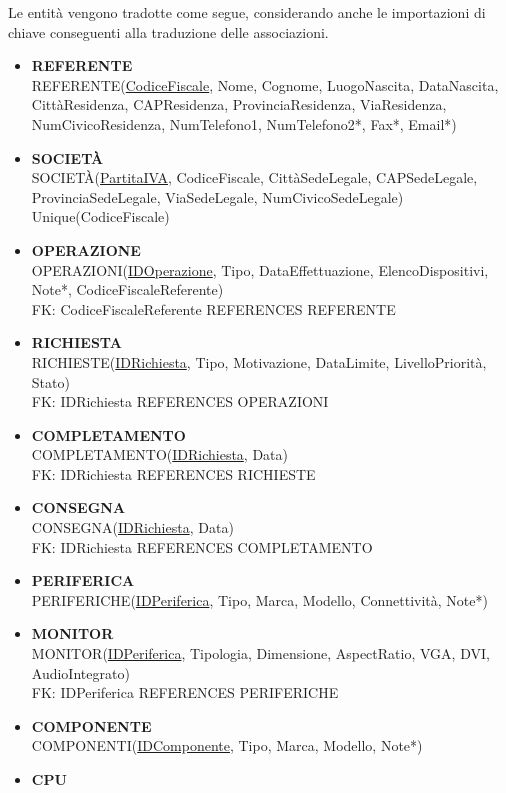 \documentclass[a4paper,12pt]{report}
\begin{document}
Le entità vengono tradotte come segue, considerando anche le importazioni di chiave conseguenti alla traduzione delle associazioni.
\begin{itemize}
	\item \textbf{REFERENTE}
		\\ REFERENTE(\underline{CodiceFiscale}, Nome, Cognome, LuogoNascita, DataNascita, CittàResidenza, CAPResidenza, ProvinciaResidenza, ViaResidenza, NumCivicoResidenza, NumTelefono1, NumTelefono2*, Fax*, Email*)
	\item \textbf{SOCIETÀ}
		\\ SOCIETÀ(\underline{PartitaIVA}, CodiceFiscale, CittàSedeLegale, CAPSedeLegale, ProvinciaSedeLegale, ViaSedeLegale, NumCivicoSedeLegale)
		\\ Unique(CodiceFiscale)
	\item \textbf{OPERAZIONE}
		\\ OPERAZIONI(\underline{IDOperazione}, Tipo, DataEffettuazione, ElencoDispositivi, Note*, CodiceFiscaleReferente)
		\\ FK: CodiceFiscaleReferente REFERENCES REFERENTE
	\item \textbf{RICHIESTA}
		\\ RICHIESTE(\underline{IDRichiesta}, Tipo, Motivazione, DataLimite, LivelloPriorità, Stato)
		\\ FK: IDRichiesta REFERENCES OPERAZIONI
	\item \textbf{COMPLETAMENTO}
		\\ COMPLETAMENTO(\underline{IDRichiesta}, Data)
		\\ FK: IDRichiesta REFERENCES RICHIESTE
	\item \textbf{CONSEGNA}
		\\ CONSEGNA(\underline{IDRichiesta}, Data)
		\\ FK: IDRichiesta REFERENCES COMPLETAMENTO
	\item \textbf{PERIFERICA}
		\\ PERIFERICHE(\underline{IDPeriferica}, Tipo, Marca, Modello, Connettività, Note*)
	\item \textbf{MONITOR}
		\\ MONITOR(\underline{IDPeriferica}, Tipologia, Dimensione, AspectRatio, VGA, DVI, AudioIntegrato)
		\\ FK: IDPeriferica REFERENCES PERIFERICHE
	\item \textbf{COMPONENTE}
		\\ COMPONENTI(\underline{IDComponente}, Tipo, Marca, Modello, Note*)
	\item \textbf{CPU}

\end{itemize}
\end{document}
